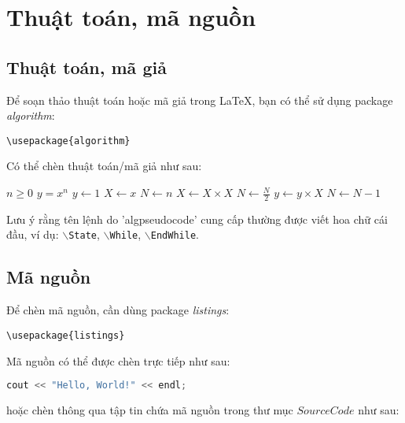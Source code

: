 \chapter{Thuật toán, mã nguồn}
\label{Chapter4}

\section{Thuật toán, mã giả}
Để soạn thảo thuật toán hoặc mã giả trong LaTeX, bạn có thể sử dụng package \textit{algorithm}:
\begin{lstlisting}
\usepackage{algorithm}
\end{lstlisting}

Có thể chèn thuật toán/mã giả như sau:

\begin{algorithm}
\caption{An algorithm with caption}\label{alg:cap}
\begin{algorithmic}[1]
\Require $n \geq 0$
\Ensure $y = x^n$
\State $y \gets 1$
\State $X \gets x$
\State $N \gets n$
    \State $X \gets X \times X$
    \State $N \gets \frac{N}{2}$  
    \State $y \gets y \times X$
    \State $N \gets N - 1$
\EndIf
\EndWhile
\end{algorithmic}
\end{algorithm}

Lưu ý rằng tên lệnh do 'algpseudocode' cung cấp thường được viết hoa chữ cái đầu, ví dụ: $\backslash${\tt{State}}, $\backslash${\tt{While}}, $\backslash${\tt{EndWhile}}.


\section{Mã nguồn}
Để chèn mã nguồn, cần dùng package \textit{listings}:

\begin{lstlisting}
\usepackage{listings}
\end{lstlisting}

Mã nguồn có thể được chèn trực tiếp như sau:

\begin{lstlisting}[language=C++]
cout << "Hello, World!" << endl;
\end{lstlisting}
hoặc chèn thông qua tập tin chứa mã nguồn trong thư mục $SourceCode$ như sau:







